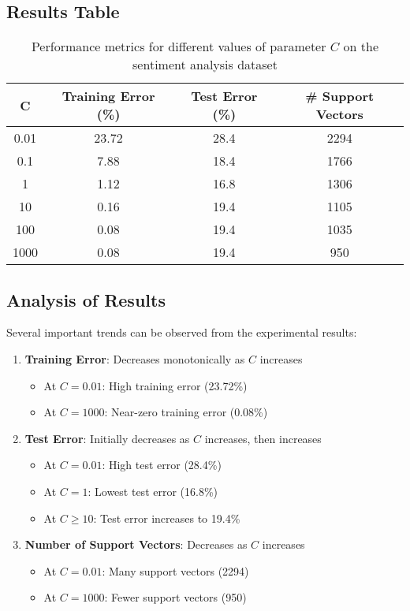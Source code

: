 \documentclass{article}
\begin{document}
\subsection{Results Table}
\begin{table}[h]
\centering
\begin{tabular}{|c|c|c|c|}
\hline
\textbf{C} & \textbf{Training Error (\%)} & \textbf{Test Error (\%)} & \textbf{\# Support Vectors} \\
\hline
0.01 & 23.72 & 28.4 & 2294 \\
0.1 & 7.88 & 18.4 & 1766 \\
1 & 1.12 & 16.8 & 1306 \\
10 & 0.16 & 19.4 & 1105 \\
100 & 0.08 & 19.4 & 1035 \\
1000 & 0.08 & 19.4 & 950 \\
\hline
\end{tabular}
\caption{Performance metrics for different values of parameter $C$ on the sentiment analysis dataset}
\end{table}

\subsection{Analysis of Results}
Several important trends can be observed from the experimental results:

\begin{enumerate}
    \item \textbf{Training Error}: Decreases monotonically as $C$ increases
    \begin{itemize}
        \item At $C = 0.01$: High training error (23.72\%)
        \item At $C = 1000$: Near-zero training error (0.08\%)
    \end{itemize}
    
    \item \textbf{Test Error}: Initially decreases as $C$ increases, then increases
    \begin{itemize}
        \item At $C = 0.01$: High test error (28.4\%)
        \item At $C = 1$: Lowest test error (16.8\%)
        \item At $C \geq 10$: Test error increases to 19.4\%
    \end{itemize}
    
    \item \textbf{Number of Support Vectors}: Decreases as $C$ increases
    \begin{itemize}
        \item At $C = 0.01$: Many support vectors (2294)
        \item At $C = 1000$: Fewer support vectors (950)
    \end{itemize}
\end{enumerate}
\end{document}
